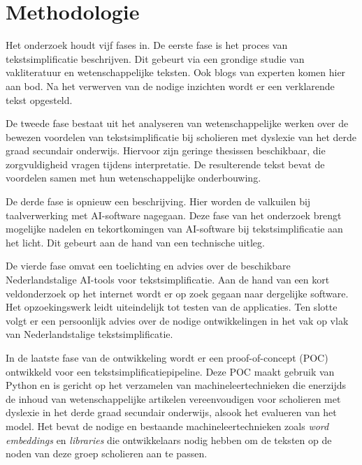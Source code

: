 


\section{Methodologie}%
\label{sec:methodologie}

Het onderzoek houdt vijf fases in. De eerste fase is het proces van tekstsimplificatie beschrijven. Dit gebeurt via een grondige studie van vakliteratuur en wetenschappelijke teksten. Ook blogs van experten komen hier aan bod. Na het verwerven van de nodige inzichten wordt er een verklarende tekst opgesteld.

De tweede fase bestaat uit het analyseren van wetenschappelijke werken over de bewezen voordelen van tekstsimplificatie bij scholieren met dyslexie van het derde graad secundair onderwijs. Hiervoor zijn geringe thesissen beschikbaar, die zorgvuldigheid vragen tijdens interpretatie. De resulterende tekst bevat de voordelen samen met hun wetenschappelijke onderbouwing.

De derde fase is opnieuw een beschrijving. Hier worden de valkuilen bij taalverwerking met AI-software nagegaan. Deze fase van het onderzoek brengt mogelijke nadelen en tekortkomingen van AI-software bij tekstsimplificatie aan het licht. Dit gebeurt aan de hand van een technische uitleg.

De vierde fase omvat een toelichting en advies over de beschikbare Nederlandstalige AI-tools voor tekstsimplificatie. Aan de hand van een kort veldonderzoek op het internet wordt er op zoek gegaan naar dergelijke software. Het opzoekingswerk leidt uiteindelijk tot testen van de applicaties. Ten slotte volgt er een persoonlijk advies over de nodige ontwikkelingen in het vak op vlak van Nederlandstalige tekstsimplificatie.

In de laatste fase van de ontwikkeling wordt er een proof-of-concept (POC) ontwikkeld voor een tekstsimplificatiepipeline. Deze POC maakt gebruik van Python en is gericht op het verzamelen van machineleertechnieken die enerzijds de inhoud van wetenschappelijke artikelen vereenvoudigen voor scholieren met dyslexie in het derde graad secundair onderwijs, alsook het evalueren van het model. Het bevat de nodige en bestaande machineleertechnieken zoals \textit{word embeddings} en \textit{libraries} die ontwikkelaars nodig hebben om de teksten op de noden van deze groep scholieren aan te passen.

